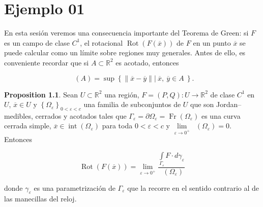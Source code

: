 \documentclass[
]{krantz}
\theoremstyle{definition}
\renewcommand{\epsilon}{\varepsilon}  %
\newtheorem{proposition}{Proposition}[chapter]
\theoremstyle{definition}
\theoremstyle{definition}
\theoremstyle{definition}
\theoremstyle{remark}
\begin{document}
\hypertarget{ejemplo-01}{%
\chapter{Ejemplo 01}\label{ejemplo-01}}

En esta sesión veremos una consecuencia importante del Teorema de Green: si \(F\) es un campo de clase \(C^1\), el rotacional \(\mathop{\mathrm{Rot}}\left( F(\overline{x}) \right)\) de \(F\) en un punto \(\overline{x}\) se puede calcular como un límite sobre regiones muy generales. Antes de ello, es conveniente recordar que si \(A\subset\mathbb{R}^2\) es acotado, entonces

\begin{equation*}
        \mathop{\mathrm{di\acute{a}m}}(A) = \sup \left\{ \|\overline{x} - \overline{y}\| \left\lvert \ \overline{x},\ \overline{y}\in A \right.  \  \right\} .
\end{equation*}

\begin{proposition}
\protect\hypertarget{prp:prop01}{}{\label{prp:prop01} }Sean \(U\subset\mathbb{R}^2\) una región, \(F = \left(P, Q\right): U\to \mathbb{R}^2\) de clase \(C^1\) en \(U\), \(\overline{x}\in U\) y \(\left\{ \Omega_{\epsilon} \right\}_{0<\epsilon <c}\) una familia de subconjuntos de \(U\) que son Jordan--medibles, cerrados y acotados tales que \(\Gamma_{\epsilon} = \partial \Omega_{\epsilon} = \mathop{\mathrm{Fr}}\left( \Omega_{\epsilon}\right)\) es una curva cerrada simple, \(\overline{x}\in\mathop{\mathrm{int}}\left(\Omega_{\epsilon}\right)\) para toda \(0 < \epsilon < c\) y \(\lim\limits_{\epsilon\to 0^{+}} \mathop{\mathrm{di\acute{a}m}}\left(\Omega_{\epsilon}\right) = 0\). Entonces

\begin{equation*}
            \mathop{\mathrm{Rot}}\left( F(\overline{x})\right) = \lim\limits_{\epsilon\to 0^{+}} \frac{\displaystyle\int\limits_{\Gamma_{\epsilon}} F\cdot d\gamma_{\epsilon}}{\mathop{\mathrm{\acute{a}rea}}\left( \Omega_{\epsilon}\right)}
\end{equation*}

donde \(\gamma_{\epsilon}\) es una parametrización de \(\Gamma_{\epsilon}\) que la recorre en el sentido contrario al de las manecillas del reloj.
\end{proposition}
\end{document}
